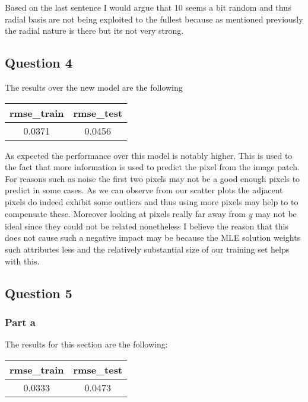 \documentclass[11pt]{article}
\begin{document}
Based on the last sentence I would argue that 10 seems a bit random and thus radial basis are not being exploited to the fullest because as mentioned previously the radial nature is there but its not very strong.


\subsection{Question 4}

The results over the new model are the following
\begin{center}
\begin{tabular}{|c|c|}
\hline
 rmse\_train & rmse\_test \\
 \hline
0.0371 & 0.0456 \\
\hline
\end{tabular}
\end{center}
As expected the performance over this model is notably higher. This is used to the fact that more information is used to predict the pixel from the image patch. For reasons such as noise the first two pixels may not be a good enough pixels to predict in some cases. As we can observe from our scatter plots the adjacent pixels do indeed exhibit some outliers and thus using more pixels may help to to compensate these. Moreover looking at pixels really far away from $\underline{y}$ may not be ideal since they could not be related nonetheless I believe the reason that this does not cause such a negative impact may be because the MLE solution weights such attributes less and the relatively substantial size of our training set helps with this.


\subsection{Question 5}
%
%
%
%
%


\subsubsection{Part a}

The results for this section are the following:
\begin{center}

\begin{tabular}{|c|c|}
\hline
 rmse\_train & rmse\_test \\
 \hline
0.0333 & 0.0473 \\
\hline
\end{tabular}
\end{center}
\end{document}
